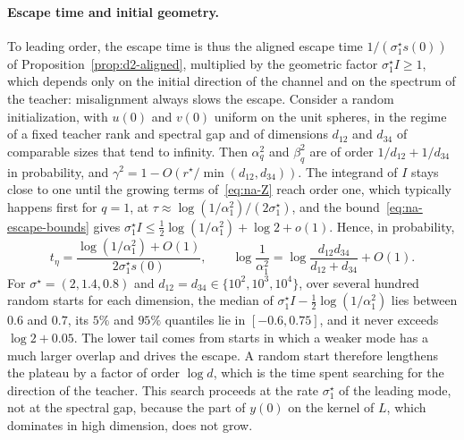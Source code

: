 \documentclass[11pt]{article}
\theoremstyle{definition}
\numberwithin{equation}{section}
\begin{document}
\paragraph{Escape time and initial geometry.}
To leading order, the escape time is thus the aligned escape time $1/(\sigma^\star_1s(0))$ of Proposition~\ref{prop:d2-aligned}, multiplied by the geometric factor $\sigma^\star_1I\ge1$, which depends only on the initial direction of the channel and on the spectrum of the teacher: misalignment always slows the escape. Consider a random initialization, with $u(0)$ and $v(0)$ uniform on the unit spheres, in the regime of a fixed teacher rank and spectral gap and of dimensions $d_{12}$ and $d_{34}$ of comparable sizes that tend to infinity. Then $\alpha_q^2$ and $\beta_q^2$ are of order $1/d_{12}+1/d_{34}$ in probability, and $\gamma^2=1-O(r^\star/\min(d_{12},d_{34}))$. The integrand of $I$ stays close to one until the growing terms of~\eqref{eq:na-Z} reach order one, which typically happens first for $q=1$, at $\tau\approx\log(1/\alpha_1^2)/(2\sigma^\star_1)$, and the bound~\eqref{eq:na-escape-bounds} gives $\sigma^\star_1I\le\tfrac12\log(1/\alpha_1^2)+\log2+o(1)$. Hence, in probability,
\begin{equation}\label{eq:na-escape-random}
t_\eta=\frac{\log(1/\alpha_1^2)+O(1)}{2\sigma^\star_1s(0)},\qquad\log\frac1{\alpha_1^2}=\log\frac{d_{12}d_{34}}{d_{12}+d_{34}}+O(1).
\end{equation}
For $\sigma^\star=(2,1.4,0.8)$ and $d_{12}=d_{34}\in\{10^2,10^3,10^4\}$, over several hundred random starts for each dimension, the median of $\sigma^\star_1I-\tfrac12\log(1/\alpha_1^2)$ lies between $0.6$ and $0.7$, its $5\%$ and $95\%$ quantiles lie in $[-0.6,0.75]$, and it never exceeds $\log2+0.05$. The lower tail comes from starts in which a weaker mode has a much larger overlap and drives the escape. A random start therefore lengthens the plateau by a factor of order $\log d$, which is the time spent searching for the direction of the teacher. This search proceeds at the rate $\sigma^\star_1$ of the leading mode, not at the spectral gap, because the part of $y(0)$ on the kernel of $L$, which dominates in high dimension, does not grow.
\end{document}
